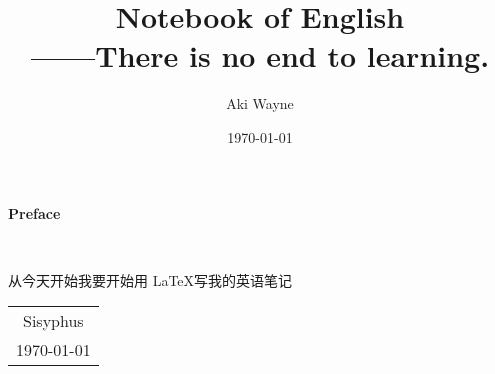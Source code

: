 \documentclass[12pt,a4paper,oneside]{ctexbook} %
\title{\textbf{Notebook of English} \\ ——There is no end to learning.}
\author{Aki Wayne}
\date{\today}
\begin{document}
\maketitle

\setcounter{page}{1}
\begin{center}
    \Huge{\textbf{Preface}}
\end{center}~\

从今天开始我要开始用 \LaTeX 写我的英语笔记
~\\
\begin{flushright}
    \begin{tabular}{c}
        Sisyphus\\
        \today
    \end{tabular}
\end{flushright}

\newpage
\end{document}
